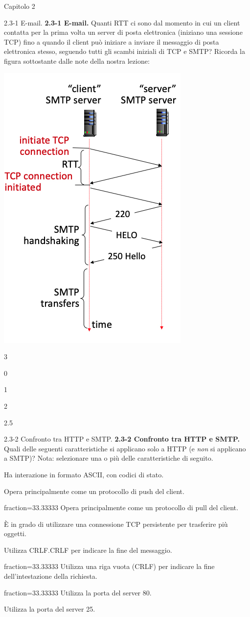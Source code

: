 \documentclass[a4paper]{article}
\begin{document}
\begin{quiz}{Capitolo 2}
\begin{multi}[points=1,shuffle]{2.3-1 E-mail.}
\textbf{2.3-1 E-mail.} 
Quanti RTT ci sono dal momento in cui un client contatta per la prima volta un server di posta elettronica (iniziano una sessione TCP) fino a quando il client può iniziare a inviare il messaggio di posta elettronica stesso, seguendo tutti gli scambi iniziali di TCP e SMTP? 
Ricorda la figura sottostante dalle note della nostra lezione:

\begin{center}
\includegraphics[width=.4\linewidth]{figs/2.3.1.jpg}
\end{center}

\item* 3
\item 0
\item 1
\item 2
\item 2.5
\end{multi}
        

\begin{multi}[points=1,shuffle,multiple]{2.3-2 Confronto tra HTTP e SMTP.}
\textbf{2.3-2 Confronto tra HTTP e SMTP.} 
Quali delle seguenti caratteristiche si applicano solo a HTTP (e \emph{non} si applicano a SMTP)?  
Nota: selezionare una o più delle caratteristiche di seguito.

\item Ha interazione in formato ASCII, con codici di stato.
\item Opera principalmente come un protocollo di push del client.
\item[fraction=33.33333] Opera principalmente come un protocollo di pull del client.
\item È in grado di utilizzare una connessione TCP persistente per trasferire più oggetti.
\item Utilizza CRLF.CRLF per indicare la fine del messaggio.
\item[fraction=33.33333] Utilizza una riga vuota (CRLF) per indicare la fine dell'intestazione della richiesta.
\item[fraction=33.33333] Utilizza la porta del server 80.
\item Utilizza la porta del server 25.
\end{multi}
            


\end{quiz}
\end{document}
